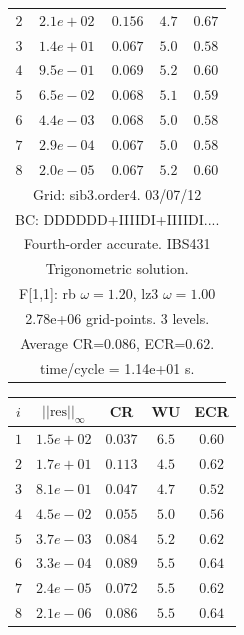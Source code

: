 \begin{table}[hbt]
\begin{center}
{\begin{tabular}{|c|c|c|c|c|}
 $ 2$  & $ 2.1e+02$ & $0.156$ & $ 4.7$ & $0.67$ \\ 
 $ 3$  & $ 1.4e+01$ & $0.067$ & $ 5.0$ & $0.58$ \\ 
 $ 4$  & $ 9.5e-01$ & $0.069$ & $ 5.2$ & $0.60$ \\ 
 $ 5$  & $ 6.5e-02$ & $0.068$ & $ 5.1$ & $0.59$ \\ 
 $ 6$  & $ 4.4e-03$ & $0.068$ & $ 5.0$ & $0.58$ \\ 
 $ 7$  & $ 2.9e-04$ & $0.067$ & $ 5.0$ & $0.58$ \\ 
 $ 8$  & $ 2.0e-05$ & $0.067$ & $ 5.2$ & $0.60$ \\ 
\hline 
\multicolumn{5}{|c|}{Grid: sib3.order4. 03/07/12}  \\
\multicolumn{5}{|c|}{BC: DDDDDD+IIIIDI+IIIIDI....}  \\
\multicolumn{5}{|c|}{Fourth-order accurate. IBS431}  \\
\multicolumn{5}{|c|}{Trigonometric solution.}  \\
\multicolumn{5}{|c|}{F[1,1]: rb $\omega=1.20$, lz3 $\omega=1.00$}  \\
\multicolumn{5}{|c|}{2.78e+06 grid-points. 3 levels.}  \\
\multicolumn{5}{|c|}{Average CR=$0.086$, ECR=$0.62$.}  \\
\multicolumn{5}{|c|}{time/cycle = 1.14e+01 s.}  \\
\hline 
\end{tabular}
\begin{tabular}{|c|c|c|c|c|} \hline 
 $i$   & $\vert\vert\mbox{res}\vert\vert_\infty$  &  CR     &  WU    & ECR  \\   \hline 
 $ 1$  & $ 1.5e+02$ & $0.037$ & $ 6.5$ & $0.60$ \\ 
 $ 2$  & $ 1.7e+01$ & $0.113$ & $ 4.5$ & $0.62$ \\ 
 $ 3$  & $ 8.1e-01$ & $0.047$ & $ 4.7$ & $0.52$ \\ 
 $ 4$  & $ 4.5e-02$ & $0.055$ & $ 5.0$ & $0.56$ \\ 
 $ 5$  & $ 3.7e-03$ & $0.084$ & $ 5.2$ & $0.62$ \\ 
 $ 6$  & $ 3.3e-04$ & $0.089$ & $ 5.5$ & $0.64$ \\ 
 $ 7$  & $ 2.4e-05$ & $0.072$ & $ 5.5$ & $0.62$ \\ 
 $ 8$  & $ 2.1e-06$ & $0.086$ & $ 5.5$ & $0.64$ \\ 

\end{tabular}}
\end{center}
\end{table}
